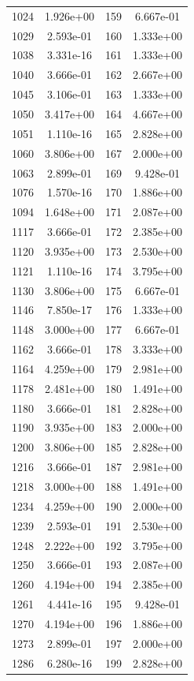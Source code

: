\documentclass[12pt]{article}
\begin{document}
\begin{longtable}{@{}cccc@{}}
1024 & 1.926e+00 & 159 & 6.667e-01 \\
1029 & 2.593e-01 & 160 & 1.333e+00 \\
1038 & 3.331e-16 & 161 & 1.333e+00 \\
1040 & 3.666e-01 & 162 & 2.667e+00 \\
1045 & 3.106e-01 & 163 & 1.333e+00 \\
1050 & 3.417e+00 & 164 & 4.667e+00 \\
1051 & 1.110e-16 & 165 & 2.828e+00 \\
1060 & 3.806e+00 & 167 & 2.000e+00 \\
1063 & 2.899e-01 & 169 & 9.428e-01 \\
1076 & 1.570e-16 & 170 & 1.886e+00 \\
1094 & 1.648e+00 & 171 & 2.087e+00 \\
1117 & 3.666e-01 & 172 & 2.385e+00 \\
1120 & 3.935e+00 & 173 & 2.530e+00 \\
1121 & 1.110e-16 & 174 & 3.795e+00 \\
1130 & 3.806e+00 & 175 & 6.667e-01 \\
1146 & 7.850e-17 & 176 & 1.333e+00 \\
1148 & 3.000e+00 & 177 & 6.667e-01 \\
1162 & 3.666e-01 & 178 & 3.333e+00 \\
1164 & 4.259e+00 & 179 & 2.981e+00 \\
1178 & 2.481e+00 & 180 & 1.491e+00 \\
1180 & 3.666e-01 & 181 & 2.828e+00 \\
1190 & 3.935e+00 & 183 & 2.000e+00 \\
1200 & 3.806e+00 & 185 & 2.828e+00 \\
1216 & 3.666e-01 & 187 & 2.981e+00 \\
1218 & 3.000e+00 & 188 & 1.491e+00 \\
1234 & 4.259e+00 & 190 & 2.000e+00 \\
1239 & 2.593e-01 & 191 & 2.530e+00 \\
1248 & 2.222e+00 & 192 & 3.795e+00 \\
1250 & 3.666e-01 & 193 & 2.087e+00 \\
1260 & 4.194e+00 & 194 & 2.385e+00 \\
1261 & 4.441e-16 & 195 & 9.428e-01 \\
1270 & 4.194e+00 & 196 & 1.886e+00 \\
1273 & 2.899e-01 & 197 & 2.000e+00 \\
1286 & 6.280e-16 & 199 & 2.828e+00 \\

\end{longtable}
\end{document}

